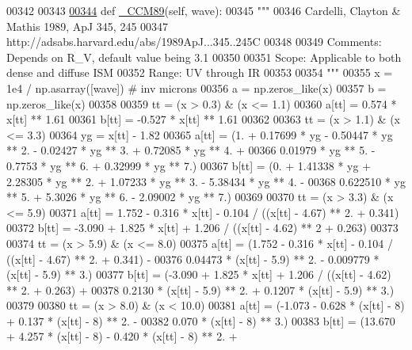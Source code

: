 \begin{DoxyCode}
00342     
00343                             
\hypertarget{red__corr_8py_source_l00344}{}\hyperlink{classpyneb_1_1extinction_1_1red__corr_1_1_red_corr_a51dd4794e0a4f7f02382f424cad7e0f9}{00344}     \textcolor{keyword}{def }\hyperlink{classpyneb_1_1extinction_1_1red__corr_1_1_red_corr_a51dd4794e0a4f7f02382f424cad7e0f9}{\_CCM89}(self, wave):
00345         \textcolor{stringliteral}{"""}
00346 \textcolor{stringliteral}{        Cardelli, Clayton & Mathis 1989, ApJ 345, 245}
00347 \textcolor{stringliteral}{        http://adsabs.harvard.edu/abs/1989ApJ...345..245C}
00348 \textcolor{stringliteral}{}
00349 \textcolor{stringliteral}{        Comments: Depends on R\_V, default value being 3.1}
00350 \textcolor{stringliteral}{}
00351 \textcolor{stringliteral}{        Scope: Applicable to both dense and diffuse ISM}
00352 \textcolor{stringliteral}{        Range: UV through IR}
00353 \textcolor{stringliteral}{        }
00354 \textcolor{stringliteral}{        """}
00355         x = 1e4 / np.asarray([wave]) \textcolor{comment}{# inv microns}
00356         a = np.zeros\_like(x)
00357         b = np.zeros\_like(x)
00358         
00359         tt = (x > 0.3) & (x <= 1.1)
00360         a[tt] = 0.574 * x[tt] ** 1.61 
00361         b[tt] = -0.527 * x[tt] ** 1.61
00362     
00363         tt = (x > 1.1) & (x <= 3.3)
00364         yg = x[tt] - 1.82
00365         a[tt] = (1. + 0.17699 * yg - 0.50447 * yg ** 2. - 0.02427 * yg ** 3. + 0.72085 * yg ** 4. + 
00366                  0.01979 * yg ** 5. - 0.7753 * yg ** 6. + 0.32999 * yg ** 7.)
00367         b[tt] = (0. + 1.41338 * yg + 2.28305 * yg ** 2. + 1.07233 * yg ** 3. - 5.38434 * yg ** 4. - 
00368                  0.622510 * yg ** 5. + 5.3026 * yg ** 6. - 2.09002 * yg ** 7.)
00369         
00370         tt = (x > 3.3) & (x <= 5.9)
00371         a[tt] = 1.752 - 0.316 * x[tt] - 0.104 / ((x[tt] - 4.67) ** 2. + 0.341)
00372         b[tt] = -3.090 + 1.825 * x[tt] + 1.206 / ((x[tt] - 4.62) ** 2 + 0.263)
00373         
00374         tt = (x > 5.9) & (x <= 8.0)
00375         a[tt] = (1.752 - 0.316 * x[tt] - 0.104 / ((x[tt] - 4.67) ** 2. + 0.341) - 
00376                  0.04473 * (x[tt] - 5.9) ** 2. - 0.009779 * (x[tt] - 5.9) ** 3.)
00377         b[tt] = (-3.090 + 1.825 * x[tt] + 1.206 / ((x[tt] - 4.62) ** 2. + 0.263) + 
00378                  0.2130 * (x[tt] - 5.9) ** 2. + 0.1207 * (x[tt] - 5.9) ** 3.)
00379         
00380         tt = (x > 8.0) & (x < 10.0)
00381         a[tt] = (-1.073 - 0.628 * (x[tt] - 8) + 0.137 * (x[tt] - 8) ** 2. - 
00382                  0.070 * (x[tt] - 8) ** 3.)
00383         b[tt] = (13.670 + 4.257 * (x[tt] - 8) - 0.420 * (x[tt] - 8) ** 2. + 

\end{DoxyCode}
